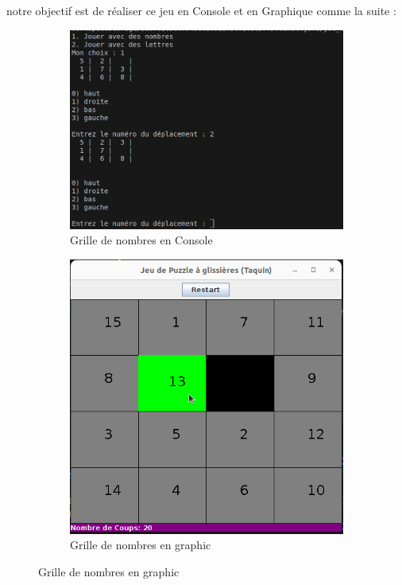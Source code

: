 \documentclass[a4paper,10pt]{article}
\begin{document}
notre objectif est de réaliser ce jeu en Console et en Graphique comme la suite : 

\begin{figure}[H]
\centering
\begin{subfigure}{0.50\textwidth}
  \centering
  \includegraphics[width=\linewidth]{captures/consol.png}
  \caption{Grille de nombres en Console}
\end{subfigure}
\hfill
\begin{subfigure}{0.45\textwidth}
  \centering
  \includegraphics[width=\linewidth]{captures/image.png}
  \caption{Grille de nombres en graphic}
\end{subfigure}
\end{figure}
\end{document}
